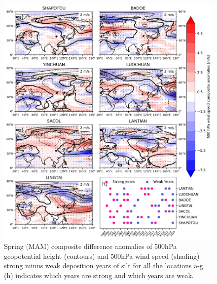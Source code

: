 \begin{figure}[hptb]
    \centering
    \includegraphics[width=\columnwidth]{texfiles/figs/geopot_ws_500hPa_20micron_MAM.pdf}
    \caption{Spring (MAM) composite difference anomalies of 500hPa geopotential height (contours) and 500hPa wind speed (shading) strong minus weak deposition years of silt for all the locations a-g  (h) indicates which years are strong and which years are weak.}
    \label{fig:MAM_500hPa_coarse_composite}
\end{figure}